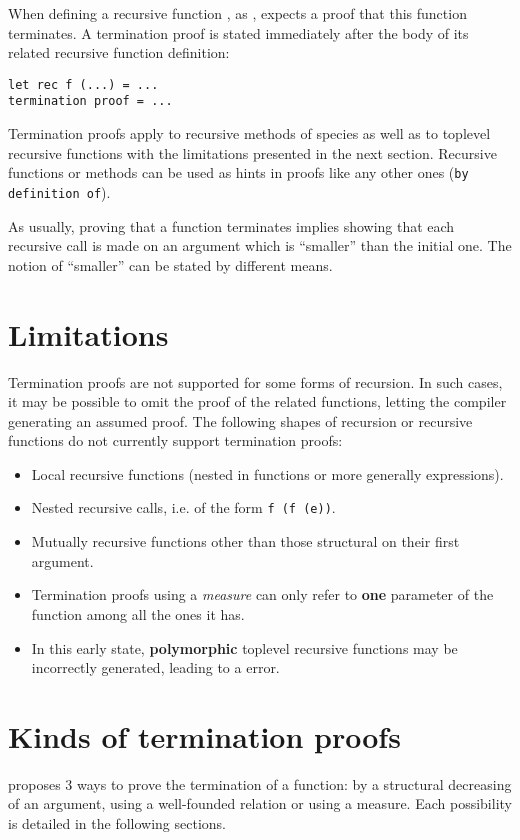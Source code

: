 
When defining a recursive function {\focal}, as {\coq}, expects a proof that
this function terminates. A termination proof is stated immediately after the
body of its related recursive function definition:

{\scriptsize
\begin{lstlisting}
let rec f (...) = ...
termination proof = ...
\end{lstlisting}
}

Termination proofs apply to recursive methods of species as well as to toplevel
recursive functions with the limitations presented in the next section.
Recursive functions or methods can be used as {\zenon} hints in proofs like
any other ones (\lstinline"by definition of").

As usually, proving that a function terminates implies showing that each
recursive call is made on an argument which is ``smaller'' than the initial
one. The notion of ``smaller'' can be stated by different means.


\section{Limitations}
Termination proofs are not supported for some forms of recursion. In such
cases, it may be possible to omit the proof of the related functions, letting
the compiler generating an assumed proof. The following shapes of recursion
or recursive functions do not currently support termination proofs:

\begin{itemize}
\item Local recursive functions (nested in functions or more generally
      expressions).
\item Nested recursive calls, i.e. of the form \lstinline"f (f (e))".
\item Mutually recursive functions other than those structural on their first
   argument.
\item Termination proofs using a {\em measure} can only refer to {\bf one}
   parameter of the function among all the ones it has.
\item In this early state, {\bf polymorphic} toplevel recursive functions
  may be incorrectly generated, leading to a {\coq} error.
\end{itemize}


\section{Kinds of termination proofs}
{\focal} proposes 3 ways to prove the termination of a function: by a
structural decreasing of an argument, using a well-founded relation or
using a measure. Each possibility is detailed in the following sections.


